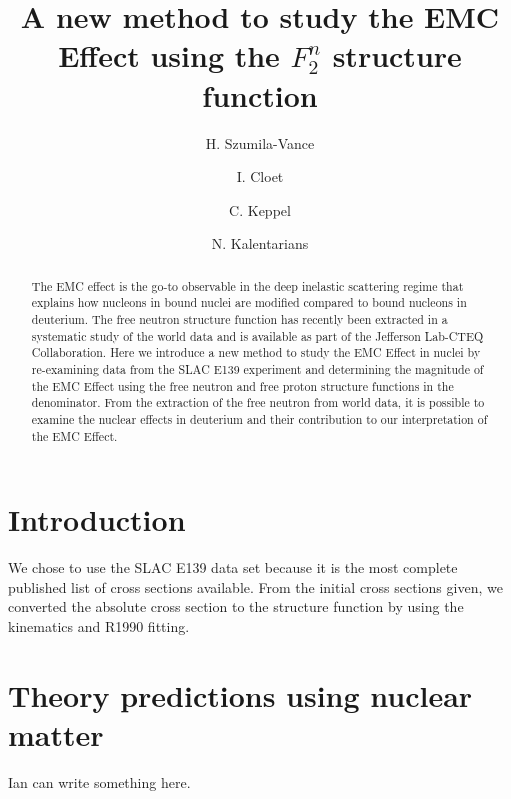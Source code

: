 \documentclass[oneside]{article}
\title{\vspace{-15mm}\fontsize{20pt}{10pt}\selectfont\textbf{A new method to study the EMC Effect using the $F_2^{n}$ structure function}} %
\author[1]{H. Szumila-Vance}
\author[2]{I. Cloet}
\author[1]{C. Keppel}
\author[3]{N. Kalentarians}
\affil[1]{Thomas Jefferson National Accelerator Facility, Newport News, VA}
\affil[2]{Argonne National Laboratory, Argonne, IL}
\affil[3]{Virginia Union University, Richmond, VA}
\date{}
\begin{document}
\maketitle %

\thispagestyle{fancy} %


\begin{abstract}
The EMC effect is the go-to observable in the deep inelastic scattering regime that explains how nucleons in bound nuclei are modified compared to bound nucleons in deuterium.  The free neutron structure function has recently been extracted in a systematic study of the world data and is available as part of the Jefferson Lab-CTEQ Collaboration. Here we introduce a new method to study the EMC Effect in nuclei by re-examining data from the SLAC E139 experiment and determining the magnitude of the EMC Effect using the free neutron and free proton structure functions in the denominator. From the extraction of the free neutron from world data, it is possible to examine the nuclear effects in deuterium and their contribution to our interpretation of the EMC Effect.

\end{abstract}


\section{Introduction}

We chose to use the SLAC E139 data set because it is the most complete published list of cross sections available. From the initial cross sections given, we converted the absolute cross section to the structure function by using the kinematics and R1990 fitting. 

  
\section{Theory predictions using nuclear matter}

Ian can write something here.
  
\end{document}
